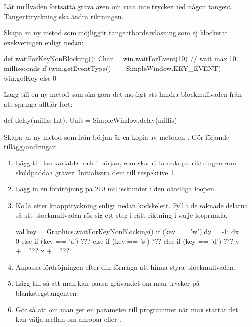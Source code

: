 
\Task
Låt mullvaden fortsätta gräva även om man inte trycker ned någon tangent. Tangenttryckning ska ändra riktningen.

\Subtask
Skapa en ny metod  som möjliggör tangentbordsavläsning som ej blockerar exekveringen enligt nedan:

\begin{Code}
  def waitForKeyNonBlocking(): Char = {
    win.waitForEvent(10) // wait max 10 milliseconds
    if (win.getEventType() == SimpleWindow.KEY_EVENT) win.getKey else 0
  }
\end{Code}

\Subtask
Lägg till en ny metod  som ska göra det möjligt att hindra blockmullvaden från att springa alltför fort:
\begin{Code}
def delay(millis: Int): Unit = SimpleWindow.delay(millis)
\end{Code}


\Subtask
Skapa en ny metod  som från början är en kopia av metoden . Gör följande tillägg/ändringar:
\begin{enumerate}

\item Lägg till två variabler  och  i början, som ska hålla reda på riktningen som sköldpaddan gräver. Initialisera dem till  respektive {1}.

\item Lägg in en fördröjning på 200 millisekunder i den oändliga loopen.

\item Kolla efter knapptryckning enligt nedan kodskelett. Fyll i de saknade delarna så att blockmullvaden rör sig ett steg i rätt riktning i varje looprunda.
\begin{Code}
      val key = Graphics.waitForKeyNonBlocking()
      if      (key == 'w') { dy = -1; dx = 0 }
      else if (key == 'a') { ??? }
      else if (key == 's') { ??? }
      else if (key == 'd') { ??? }
      y += ???
      x += ???
\end{Code}

\item Anpassa fördröjningen efter din förmåga att hinna styra blockmullvaden.

\item Lägg till så att man kan pausa grävandet om man trycker på blankstegstangenten.

\item Gör så att om man ger en parameter  till programmet när man startar det kan välja mellan om  anropar  eller .

\end{enumerate}


